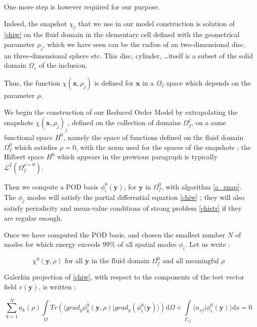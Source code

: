 One more step is however required for our purpose.

\par
Indeed, the snapshot $\chi_j$ that we use in our model construction is solution of \ref{chiw} on the fluid domain in %
the elementary cell defined with the geometrical parameter $\rho_j$, %
which we have seen can be the radius of an two-dimensional disc, an three-dimensional sphere etc. %
This disc, cylinder, \dots itself is a subset of the solid domain $\Omega_s$ of the inclusion.

\par
Thus, the function $\chi(\mathbf{x},\rho_j)$ is defined for $\mathbf{x}$ in a $\Omega_f$ space which depends on the parameter $\rho$.

\etoile
We begin the construction of our Reduced Order Model by extrapolating the snapshots $\chi(\mathbf{x},\rho_j)_j$, defined on the collection of domains $\Omega_f^j$, %
on a same functional space $H^0$, namely the space of functions defined on the fluid domain $\Omega_f^0$ which satisfies $\rho=0$, %
with the norm used for the spaces of the snapshots ; %
the Hilbert space $H^0$ which appears in the prewious paragraph is typically $\mathcal{L}^2\left(\Omega_f^{\rho=0}\right)$.

\par
Then we compute a POD basis $\phi_i^0(\mathbf{y})$, for $\mathbf{y}$ in $\Omega_f^0$, with algorithm \ref{a_snap}. %
The $\phi_j$ modes will satisfy the partial differential equation \ref{chiw} ; %
they will also satisfy periodicity and mean-value conditions of strong problem \ref{chistr} if they are regular enough.

\etoile
Once we have computed the POD basis, and chosen the smallest number $N$ of modes for which energy exceeds $99\%$ of all spatial modes $\phi_i$. %
Let us write :

\[\chi^0\left(\mathbf{y},\rho\right)\text{ for all $\mathbf{y}$ in the fluid domain $\Omega_f^0$ and all meaningful $\rho$}\]

\par
Galerkin projection of \ref{chiw}, with respect to the components of the test vector field $v(\mathbf{y})$, is written :

\begin{equation}\label{morchiz}
\sum\limits_{k=1}^N a_k(\rho)\int\limits_{\Omega}Tr\left(\langle grad_y\phi_k^0 \left(\mathbf{y},\rho\right)|grad_y\left(\phi_i^0(\mathbf{y}\right)\rangle\right)\text{d}\Omega+%
\int\limits_{\Gamma_{sf}}\langle n_{sf}|\phi_i^0(\mathbf{y})\rangle \text{d}s %
=0
\end{equation}

